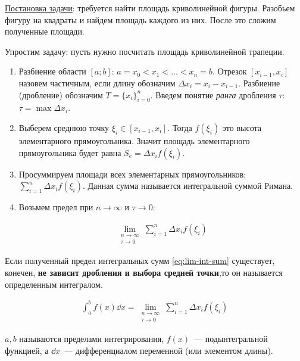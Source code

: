 
\underline{Постановка задачи}: требуется найти площадь криволинейной фигуры.
Разобьем фигуру на квадраты и найдем площадь каждого из них. После это сложим
полученные площади.



Упростим задачу: пусть нужно посчитать площадь криволинейной трапеции.

\begin{multicols}{2}


\begin{enumerate}
  \item Разбиение области \([a;b]\): \(a = x_{0} < x_{1} < \dotsc < x_{n} = b\).
  Отрезок \([x_{i - 1}, x_{i}]\) назовем частичным, если длину обозначим 
  \(\Delta x_{i} = x_{i} - x_{i - 1}\).
  Разбиение (дробление) обозначим \(T = \{ x_{i} \}_{i = 0}^{n}\). Введем
  понятие \textit{ранга} дробления \(\tau\): \(\tau = \max \Delta x_{i}\).

  \item Выберем среднюю точку \(\xi_{i} \in [x_{i - 1}, x_{i}]\). Тогда
  \(f(\xi_{i})\) это высота элементарного прямоугольника. Значит площадь
  элементарного прямоугольника будет равна \(S_{e} = \Delta x_{i} f(\xi_{i})\).

  \item Просуммируем площади всех элементарных прямоугольников:
  \(\sum_{i = 1}^{n} \Delta x_{i} f(\xi_{i})\). Данная сумма называется
  интегральной суммой Римана.

  \item Возьмем предел при \(n \to \infty\) и \(\tau \to 0\):
  
  \begin{align*}\label{eq:lim-int-sum}\tag{1}
    \lim_{\substack{n \to \infty \\ \tau \to 0}}
      \sum_{i = 1}^{n} \Delta x_{i} f(\xi_{i})
  \end{align*}
\end{enumerate}
\end{multicols}

\begin{definition}
  Если полученный предел интегральных сумм \eqref{eq:lim-int-sum} существует,
  конечен, \textbf{не зависит дробления и выбора средней точки},то он называется
  определенным интегралом.

  \begin{align*}
    \int_{a}^{b} f(x) \dd x = \lim_{\substack{n \to \infty \\ \tau \to 0}}
      \sum_{i = 1}^{n} \Delta x_{i} f(\xi_{i})
  \end{align*}

  \(a, b\) называются пределами интегрирования, \(f(x)\)~--- подынтегральной
  функцией, а \(\dd x\)~--- дифференциалом переменной (или элементом длины).
\end{definition}

